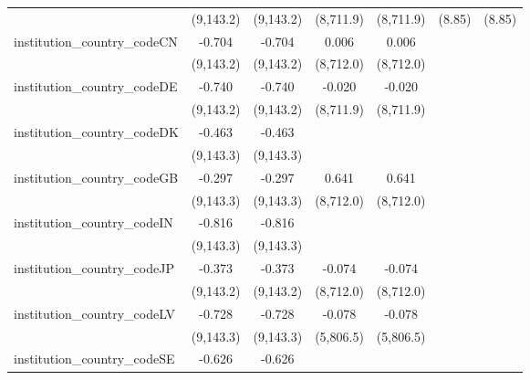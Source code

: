 \begin{tabular}{lcccccc}
                                         & (9,143.2)     & (9,143.2)     & (8,711.9)     & (8,711.9)     & (8.85)         & (8.85)\\   
   institution\_country\_codeCN          & -0.704        & -0.704        & 0.006         & 0.006         &                &   \\   
                                         & (9,143.2)     & (9,143.2)     & (8,712.0)     & (8,712.0)     &                &   \\   
   institution\_country\_codeDE          & -0.740        & -0.740        & -0.020        & -0.020        &                &   \\   
                                         & (9,143.2)     & (9,143.2)     & (8,711.9)     & (8,711.9)     &                &   \\   
   institution\_country\_codeDK          & -0.463        & -0.463        &               &               &                &   \\   
                                         & (9,143.3)     & (9,143.3)     &               &               &                &   \\   
   institution\_country\_codeGB          & -0.297        & -0.297        & 0.641         & 0.641         &                &   \\   
                                         & (9,143.3)     & (9,143.3)     & (8,712.0)     & (8,712.0)     &                &   \\   
   institution\_country\_codeIN          & -0.816        & -0.816        &               &               &                &   \\   
                                         & (9,143.3)     & (9,143.3)     &               &               &                &   \\   
   institution\_country\_codeJP          & -0.373        & -0.373        & -0.074        & -0.074        &                &   \\   
                                         & (9,143.2)     & (9,143.2)     & (8,712.0)     & (8,712.0)     &                &   \\   
   institution\_country\_codeLV          & -0.728        & -0.728        & -0.078        & -0.078        &                &   \\   
                                         & (9,143.3)     & (9,143.3)     & (5,806.5)     & (5,806.5)     &                &   \\   
   institution\_country\_codeSE          & -0.626        & -0.626        &               &               &                &   \\   

\end{tabular}
